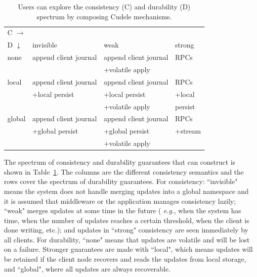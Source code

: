 \begin{table}[t]
\begin{center}
\begin{tabular}{ l | l | l | l }
  C \(\rightarrow\) &&& \\  
  D \(\downarrow\)  	     & invisible         & weak        & strong  \\\hline
  none                       & append client journal            & append client journal          & RPCs    \\
                             &                   & +volatile apply &         \\\hdashline
  local                      & append client journal            & append client journal          & RPCs    \\
                             & +local persist    & +local persist  & +local  \\
                             &                   & +volatile apply &  persist\\\hdashline
  global                     & append client journal            & append client journal          & RPCs    \\
                             & +global persist   & +global persist & +stream \\
                             &                   & +volatile apply &         \\
\end{tabular}

\caption{Users can explore the consistency (C) and
durability (D) spectrum by composing Cudele mechanisms. 
\label{table:spectrum}}
\end{center}
\end{table}

The spectrum of consistency and durability guarantees that
 can construct is shown in
Table~\ref{table:spectrum}. The columns are the different consistency semantics
and the rows cover the spectrum of durability guarantees.  For consistency:
``invisible" means the system does not handle merging updates into a global
namespace and it is assumed that middleware or the application manages
consistency lazily; ``weak" merges updates at some time in the future ({\it
e.g.}, when the system has time, when the number of updates reaches a certain
threshold, when the client is done writing, etc.); and updates in ``strong"
consistency are seen immediately by all clients. For durability, ``none" means
that updates are volatile and will be lost on a failure. Stronger guarantees
are made with ``local", which means updates will be retained if the client node
recovers and reads the updates from local storage, and ``global", where all
updates are always recoverable.

